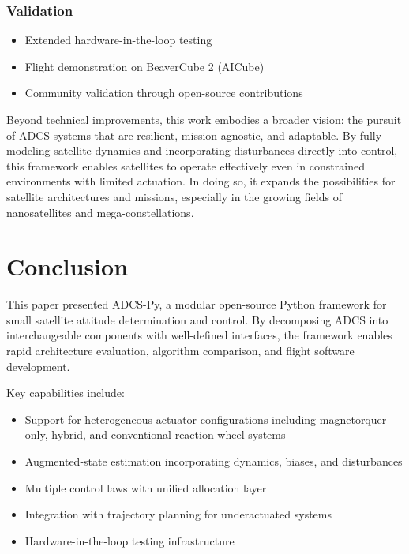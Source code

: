 \documentclass[conference]{IEEEtran}
\begin{document}
\subsubsection{Validation}
\begin{itemize}
    \item Extended hardware-in-the-loop testing
    \item Flight demonstration on BeaverCube 2 (AICube)
    \item Community validation through open-source contributions
\end{itemize}

Beyond technical improvements, this work embodies a broader vision: the pursuit of ADCS systems that are resilient, mission-agnostic, and adaptable. By fully modeling satellite dynamics and incorporating disturbances directly into control, this framework enables satellites to operate effectively even in constrained environments with limited actuation. In doing so, it expands the possibilities for satellite architectures and missions, especially in the growing fields of nanosatellites and mega-constellations.


\section{Conclusion}\label{sec:conclusion}

This paper presented ADCS-Py, a modular open-source Python framework for small satellite attitude determination and control. By decomposing ADCS into interchangeable components with well-defined interfaces, the framework enables rapid architecture evaluation, algorithm comparison, and flight software development.

Key capabilities include:
\begin{itemize}
    \item Support for heterogeneous actuator configurations including magnetorquer-only, hybrid, and conventional reaction wheel systems
    \item Augmented-state estimation incorporating dynamics, biases, and disturbances
    \item Multiple control laws with unified allocation layer
    \item Integration with trajectory planning for underactuated systems
    \item Hardware-in-the-loop testing infrastructure
\end{itemize}
\end{document}
